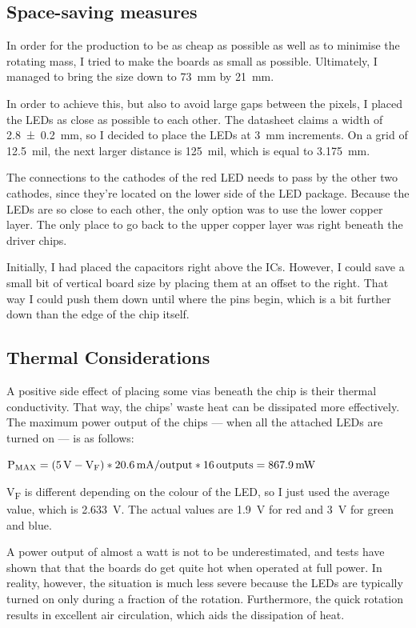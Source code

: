 \documentclass[a4paper, 11pt, titlepage]{report}
\newenvironment{ownmath}
{\vspace{2mm}\hspace{15pt}\begin{math}}
{\end{math}\vspace{2mm}}
\begin{document}
\subsection{Space-saving measures}

In order for the production to be as cheap as possible as well as to minimise the rotating mass, I 
tried to make the boards as small as possible. Ultimately, I managed to bring the size down to 
\SI{73}{\milli\meter} by \SI{21}{\milli\meter}.

In order to achieve this, but also to avoid large gaps between the pixels, I placed the LEDs as 
close as possible to each other. The datasheet claims a width of \SI{2.8 +- 0.2}{\milli\meter}, 
so I decided to place the LEDs at \SI{3}{\milli\metre} increments. On a grid of \SI{12.5}{mil}, 
the next larger distance is \SI{125}{mil}, which is equal to \SI{3.175}{mm}.

The connections to the cathodes of the red LED needs to pass by the other two cathodes, since 
they're located on the lower side of the LED package. Because the LEDs are so close to each other, 
the only option was to use the lower copper layer. The only place to go back to the upper copper 
layer was right beneath the driver chips.

Initially, I had placed the capacitors right above the ICs. However, I could save a small bit of
vertical board size by placing them at an offset to the right. That way I could push them down 
until where the pins begin, which is a bit further down than the edge of the chip itself.


\subsection{Thermal Considerations}

A positive side effect of placing some vias beneath the chip is their thermal conductivity. That
way, the chips' waste heat can be dissipated more effectively. The maximum power output of the 
chips --- when all the attached LEDs are turned on --- is as follows:

\begin{ownmath}
\textrm{P\textsubscript{MAX}} = (\SI{5}{\volt} - \textrm{V\textsubscript{F}}) * 
\SI{20.6}{\milli\ampere\per output} * \SI{16}{outputs} = \SI{867.9}{\milli\watt}
\end{ownmath}

V\textsubscript{F} is different depending on the colour of the LED, so I just used the average
value, which is \SI{2.633}{\volt}. The actual values are \SI{1.9}{\volt} for red and \SI{3}{\volt}
for green and blue.

A power output of almost a watt is not to be underestimated, and tests have shown that that the
boards do get quite hot when operated at full power. In reality, however, the situation is much
less severe because the LEDs are typically turned on only during a fraction of the rotation.
Furthermore, the quick rotation results in excellent air circulation, which aids the dissipation
of heat.
\end{document}
